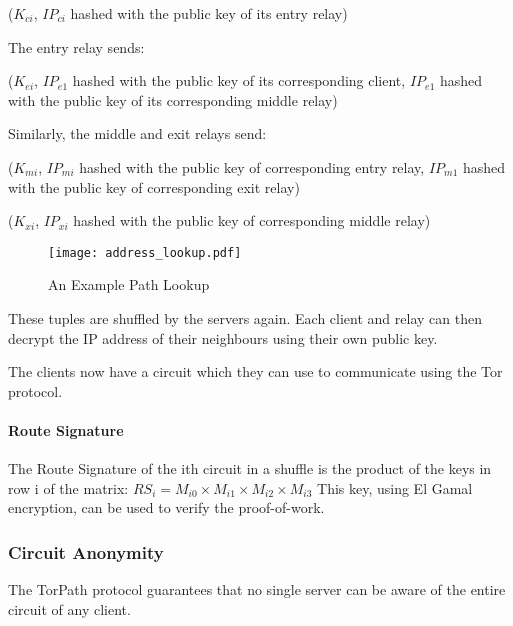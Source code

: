 ($K_{ci}$, {$IP_{ci}$ hashed with the public key of its entry relay})

The entry relay sends:

($K_{ei}$, {$IP_{e1}$ hashed with the public key of its corresponding client}, 
{$IP_{e1}$ hashed with the public key of its corresponding middle relay})

Similarly, the middle and exit relays send:

($K_{mi}$, {$IP_{mi}$ hashed with the public key of corresponding entry relay}, 
{$IP_{m1}$ hashed with the public key of corresponding exit relay})

($K_{xi}$, {$IP_{xi}$ hashed with the public key of corresponding middle relay})

\begin{figure}
  \centering
    \texttt{[image: address\_lookup.pdf]}
  \caption{An Example Path Lookup}
\end{figure}

These tuples are shuffled by the servers again. Each client and relay can then 
decrypt the IP address of their neighbours using their own public key.

The clients now have a circuit which they can use to communicate using the Tor 
protocol.

\paragraph{Route Signature}
The Route Signature of the ith circuit in a shuffle is the product of the keys
in row i of the matrix:
$RS_i = M_{i0} \times M_{i1} \times M_{i2} \times M_{i3}$
This key, using El Gamal encryption, can be used to verify the  proof-of-work.

\subsubsection{Circuit Anonymity} 
The TorPath protocol guarantees that no single server can be aware of the entire
circuit of any client. 





